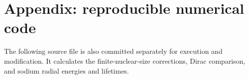 \documentclass[10pt,a4paper]{article}
\begin{document}
\clearpage
{}
{}
\section*{Appendix: reproducible numerical code}
The following source file is also committed separately
for execution and modification. It calculates the
finite-nuclear-size corrections, Dirac comparison,
and sodium radial energies and lifetimes.

\end{document}
